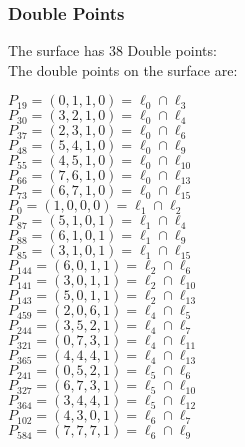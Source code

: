 \documentclass{article}
\begin{document}
{\subsubsection*{Double Points}
The surface has 38 Double points:\\
The double points on the surface are:\\
\begin{multicols}{2}
\noindent
$P_{19} = ( 0, 1, 1, 0 ) = \ell_{0} \cap \ell_{3} $\\
$P_{30} = ( 3, 2, 1, 0 ) = \ell_{0} \cap \ell_{4} $\\
$P_{37} = ( 2, 3, 1, 0 ) = \ell_{0} \cap \ell_{6} $\\
$P_{48} = ( 5, 4, 1, 0 ) = \ell_{0} \cap \ell_{9} $\\
$P_{55} = ( 4, 5, 1, 0 ) = \ell_{0} \cap \ell_{10} $\\
$P_{66} = ( 7, 6, 1, 0 ) = \ell_{0} \cap \ell_{13} $\\
$P_{73} = ( 6, 7, 1, 0 ) = \ell_{0} \cap \ell_{15} $\\
$P_{0} = ( 1, 0, 0, 0 ) = \ell_{1} \cap \ell_{2} $\\
$P_{87} = ( 5, 1, 0, 1 ) = \ell_{1} \cap \ell_{4} $\\
$P_{88} = ( 6, 1, 0, 1 ) = \ell_{1} \cap \ell_{9} $\\
$P_{85} = ( 3, 1, 0, 1 ) = \ell_{1} \cap \ell_{15} $\\
$P_{144} = ( 6, 0, 1, 1 ) = \ell_{2} \cap \ell_{6} $\\
$P_{141} = ( 3, 0, 1, 1 ) = \ell_{2} \cap \ell_{10} $\\
$P_{143} = ( 5, 0, 1, 1 ) = \ell_{2} \cap \ell_{13} $\\
$P_{459} = ( 2, 0, 6, 1 ) = \ell_{4} \cap \ell_{5} $\\
$P_{244} = ( 3, 5, 2, 1 ) = \ell_{4} \cap \ell_{7} $\\
$P_{321} = ( 0, 7, 3, 1 ) = \ell_{4} \cap \ell_{11} $\\
$P_{365} = ( 4, 4, 4, 1 ) = \ell_{4} \cap \ell_{13} $\\
$P_{241} = ( 0, 5, 2, 1 ) = \ell_{5} \cap \ell_{6} $\\
$P_{327} = ( 6, 7, 3, 1 ) = \ell_{5} \cap \ell_{10} $\\
$P_{364} = ( 3, 4, 4, 1 ) = \ell_{5} \cap \ell_{12} $\\
$P_{102} = ( 4, 3, 0, 1 ) = \ell_{6} \cap \ell_{7} $\\
$P_{584} = ( 7, 7, 7, 1 ) = \ell_{6} \cap \ell_{9} $\\

\end{multicols}}
\end{document}
